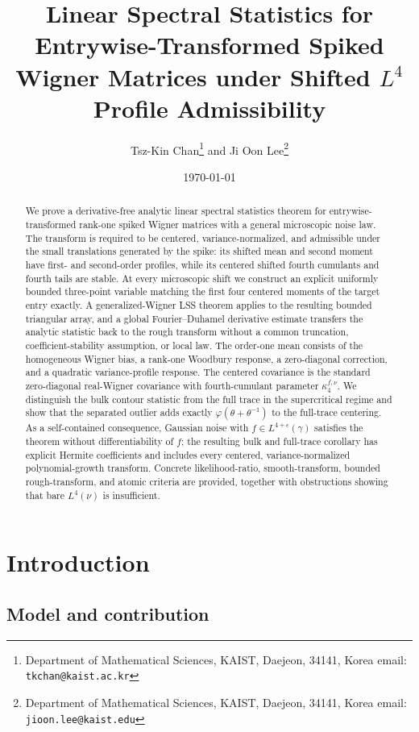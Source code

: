 \documentclass[11pt]{article}
\title{Linear Spectral Statistics for Entrywise-Transformed Spiked Wigner Matrices under Shifted $L^4$ Profile Admissibility}
\author{Tsz-Kin Chan\footnote{Department of Mathematical Sciences, KAIST, Daejeon, 34141, Korea \newline email: \texttt{tkchan@kaist.ac.kr}} and Ji Oon Lee\footnote{Department of Mathematical Sciences, KAIST, Daejeon, 34141, Korea \newline email: \texttt{jioon.lee@kaist.edu}}}
\date{\today}
\theoremstyle{definition}
\theoremstyle{remark}
\begin{document}
\maketitle
\begin{abstract}
We prove a derivative-free analytic linear spectral statistics theorem for
entrywise-transformed rank-one spiked Wigner matrices with a general
microscopic noise law.  The transform is required to be centered,
variance-normalized, and admissible under the small translations generated by
the spike: its shifted mean and second moment have first- and second-order
profiles, while its centered shifted fourth cumulants and fourth tails are
stable.  At every microscopic shift we construct an explicit uniformly
bounded three-point variable matching the first four centered moments of the
target entry exactly.  A generalized-Wigner LSS theorem applies to the
resulting bounded triangular array, and a global Fourier--Duhamel derivative
estimate transfers the analytic statistic back to the rough transform without
a common truncation, coefficient-stability assumption, or local law.
The order-one mean consists of the homogeneous Wigner bias, a rank-one
Woodbury response, a zero-diagonal correction, and a quadratic
variance-profile response.  The centered covariance is the standard
zero-diagonal real-Wigner covariance with fourth-cumulant parameter
$\kappa_4^{f,\nu}$.  We distinguish the bulk contour statistic from the full
trace in the supercritical regime and show that the separated outlier adds
exactly $\varphi(\theta+\theta^{-1})$ to the full-trace centering.  As a
self-contained consequence, Gaussian noise with
$f\in L^{4+\epsilon}(\gamma)$ satisfies the theorem without differentiability
of $f$; the resulting bulk and full-trace corollary has explicit Hermite
coefficients and includes every centered, variance-normalized
polynomial-growth transform.
Concrete likelihood-ratio, smooth-transform, bounded rough-transform, and
atomic criteria are provided, together with obstructions showing that bare
$L^4(\nu)$ is insufficient.
\end{abstract}

\tableofcontents
\section{Introduction}

\subsection{Model and contribution}
\end{document}
